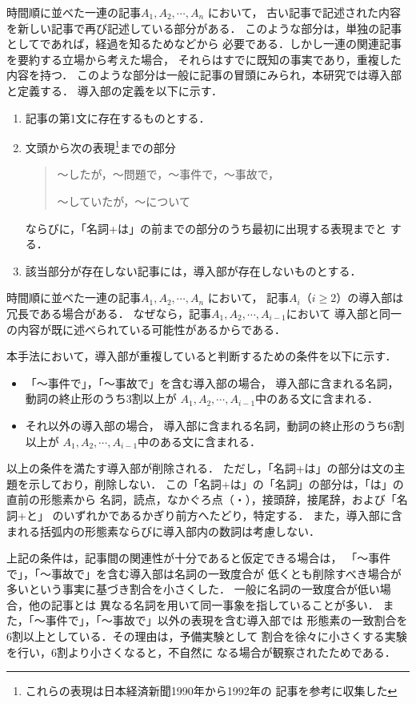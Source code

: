 時間順に並べた一連の記事$A_1, A_2, \cdots ,A_n$ において，
古い記事で記述された内容を新しい記事で再び記述している部分がある．
このような部分は，単独の記事としてであれば，経過を知るためなどから
必要である．しかし一連の関連記事を要約する立場から考えた場合，
それらはすでに既知の事実であり，重複した内容を持つ．
このような部分は一般に記事の冒頭にみられ，本研究では導入部と定義する．
導入部の定義を以下に示す．
\begin{enumerate}
 \item 記事の第1文に存在するものとする．
 \item 文頭から次の表現\footnote{これらの表現は日本経済新聞1990年から1992年の
記事を参考に収集した}までの部分
       \begin{quote}
	〜したが，〜問題で，〜事件で，〜事故で，

	〜していたが，〜について
       \end{quote}
       ならびに，「名詞+は」の前までの部分のうち最初に出現する表現までと
       する．
 \item 該当部分が存在しない記事には，導入部が存在しないものとする．
\end{enumerate}

時間順に並べた一連の記事$A_1, A_2, \cdots , A_n$ において，
記事$A_i（i \ge 2）$の導入部は冗長である場合がある．
なぜなら，記事$A_1, A_2, \cdots , A_{i-1}$において
導入部と同一の内容が既に\mbox{述べられてい}る可能性があるからである．

本手法において，導入部が重複していると判断するための条件を以下に示す．
\begin{itemize}
 \item 「〜事件で」，「〜事故で」を含む導入部の場合，
       導入部に含まれる名詞，動詞の終止形のうち3割以上が
       $A_1, A_2, \cdots , A_{i-1}$中のある文に含まれる．
 \item それ以外の導入部の場合，
       導入部に含まれる名詞，動詞の終止形のうち6割以上が
       $A_1, A_2, \cdots , A_{i-1}$中のある文に含まれる．
\end{itemize}
以上の条件を満たす導入部が削除される．
ただし，「名詞+は」の部分は文の主題を示しており，削除しない．
この「名詞+は」の「名詞」の部分は，「は」の直前の形態素から
名詞，読点，なかぐろ点（・），接頭辞，接尾辞，および「名詞+と」
のいずれかであるかぎり前方へたどり，特定する．
また，導入部に含まれる括弧内の形態素ならびに導入部内の数詞は考慮しない．

上記の条件は，記事間の関連性が十分であると仮定できる場合は，
「〜事件で」，「〜事故で」を含む導入部は名詞の一致度合が
低くとも削除すべき場合が多いという事実に基づき割合を小さくした．
一般に名詞の一致度合が低い場合，他の記事とは
異なる名詞を用いて同一事象を指していることが多い．
また，「〜事件で」，「〜事故で」以外の表現を含む導入部では
形態素の一致割合を6割以上としている．その理由は，予備実験として
割合を徐々に小さくする実験を行い，6割より小さくなると，不自然に
なる場合が観察されたためである．

